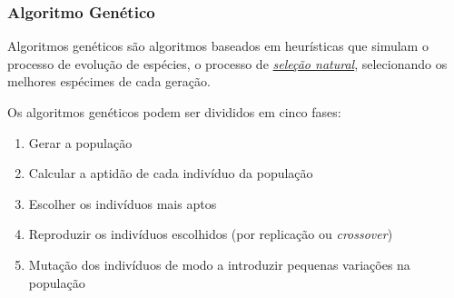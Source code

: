 \documentclass[article, a4paper, 12pt, oneside]{memoir}
\begin{document}
\subsubsection{Algoritmo Genético}
Algoritmos genéticos são algoritmos baseados em heurísticas que simulam o processo de evolução de espécies, o processo de \href{https://en.wikipedia.org/wiki/Natural_selection}{\emph{seleção natural}}, selecionando os melhores espécimes de cada geração.

Os algoritmos genéticos podem ser divididos em cinco fases:
\begin{enumerate}
	\item Gerar a população
	\item Calcular a aptidão de cada indivíduo da população
	\item Escolher os indivíduos mais aptos
	\item Reproduzir os indivíduos escolhidos (por replicação ou \emph{crossover})
	\item Mutação dos indivíduos de modo a introduzir pequenas variações na população
\end{enumerate}
\end{document}
